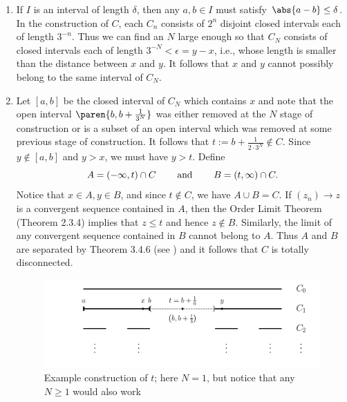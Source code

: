 \documentclass{lew98_solutions}
\begin{document}
\begin{solution}
    \begin{enumerate}
        \item If \( I \) is an interval of length \( \delta \), then any \( a, b \in I \) must satisfy \( \abs{a - b} \leq \delta \). In the construction of \( C \), each \( C_n \) consists of \( 2^n \) disjoint closed intervals each of length \( 3^{-n} \). Thus we can find an \( N \) large enough so that \( C_N \) consists of closed intervals each of length \( 3^{-N} < \epsilon = y - x \), i.e., whose length is smaller than the distance between \( x \) and \( y \). It follows that \( x \) and \( y \) cannot possibly belong to the same interval of \( C_N \).

        \item Let \( [a, b] \) be the closed interval of \( C_N \) which contains \( x \) and note that the open interval \( \paren{ b, b + \tfrac{1}{3^N} } \) was either removed at the \( N \) stage of construction or is a subset of an open interval which was removed at some previous stage of construction. It follows that \( t := b + \tfrac{1}{2 \cdot 3^N} \not\in C \). Since \( y \not\in [a, b] \) and \( y > x \), we must have \( y > t \). Define
        \[
            A = (-\infty, t) \cap C \hspace{8mm} \text{and} \hspace{8mm} B = (t, \infty) \cap C.  
        \]
        Notice that \( x \in A, y \in B \), and since \( t \not\in C \), we have \( A \cup B = C \). If \( (z_n) \to z \) is a convergent sequence contained in \( A \), then the Order Limit Theorem (Theorem 2.3.4) implies that \( z \leq t \) and hence \( z \not\in B \). Similarly, the limit of any convergent sequence contained in \( B \) cannot belong to \( A \). Thus \( A \) and \( B \) are separated by Theorem 3.4.6 (see ) and it follows that \( C \) is totally disconnected.
        \begin{figure}[H]
            \centering
            \includegraphics[width=\textwidth]{UA_Figures/UA_ex3_4_8_fig.pdf}
            \caption{Example construction of \( t \); here \( N = 1 \), but notice that any \( N \geq 1 \) would also work}
            \label{fig:ex3.4.8}
        \end{figure}
    \end{enumerate}
\end{solution}
\end{document}
